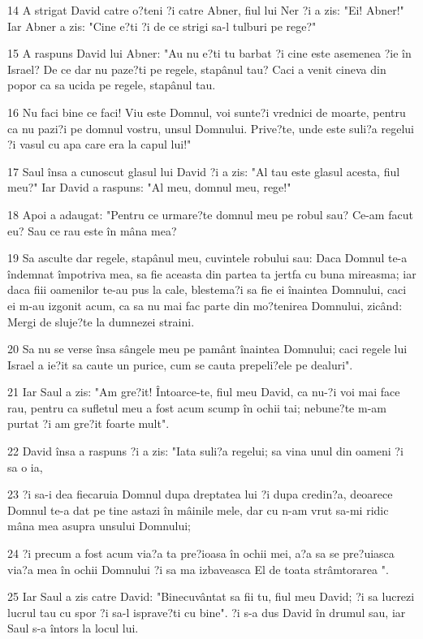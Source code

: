 \par 14 A strigat David catre o?teni ?i catre Abner, fiul lui Ner ?i a zis: "Ei! Abner!" Iar Abner a zis: "Cine e?ti ?i de ce strigi sa-l tulburi pe rege?"
\par 15 A raspuns David lui Abner: "Au nu e?ti tu barbat ?i cine este asemenea ?ie în Israel? De ce dar nu paze?ti pe regele, stapânul tau? Caci a venit cineva din popor ca sa ucida pe regele, stapânul tau.
\par 16 Nu faci bine ce faci! Viu este Domnul, voi sunte?i vrednici de moarte, pentru ca nu pazi?i pe domnul vostru, unsul Domnului. Prive?te, unde este suli?a regelui ?i vasul cu apa care era la capul lui!"
\par 17 Saul însa a cunoscut glasul lui David ?i a zis: "Al tau este glasul acesta, fiul meu?" Iar David a raspuns: "Al meu, domnul meu, rege!"
\par 18 Apoi a adaugat: "Pentru ce urmare?te domnul meu pe robul sau? Ce-am facut eu? Sau ce rau este în mâna mea?
\par 19 Sa asculte dar regele, stapânul meu, cuvintele robului sau: Daca Domnul te-a îndemnat împotriva mea, sa fie aceasta din partea ta jertfa cu buna mireasma; iar daca fiii oamenilor te-au pus la cale, blestema?i sa fie ei înaintea Domnului, caci ei m-au izgonit acum, ca sa nu mai fac parte din mo?tenirea Domnului, zicând: Mergi de sluje?te la dumnezei straini.
\par 20 Sa nu se verse însa sângele meu pe pamânt înaintea Domnului; caci regele lui Israel a ie?it sa caute un purice, cum se cauta prepeli?ele pe dealuri".
\par 21 Iar Saul a zis: "Am gre?it! Întoarce-te, fiul meu David, ca nu-?i voi mai face rau, pentru ca sufletul meu a fost acum scump în ochii tai; nebune?te m-am purtat ?i am gre?it foarte mult".
\par 22 David însa a raspuns ?i a zis: "Iata suli?a regelui; sa vina unul din oameni ?i sa o ia,
\par 23 ?i sa-i dea fiecaruia Domnul dupa dreptatea lui ?i dupa credin?a, deoarece Domnul te-a dat pe tine astazi în mâinile mele, dar cu n-am vrut sa-mi ridic mâna mea asupra unsului Domnului;
\par 24 ?i precum a fost acum via?a ta pre?ioasa în ochii mei, a?a sa se pre?uiasca via?a mea în ochii Domnului ?i sa ma izbaveasca El de toata strâmtorarea ".
\par 25 Iar Saul a zis catre David: "Binecuvântat sa fii tu, fiul meu David; ?i sa lucrezi lucrul tau cu spor ?i sa-l isprave?ti cu bine". ?i s-a dus David în drumul sau, iar Saul s-a întors la locul lui.

